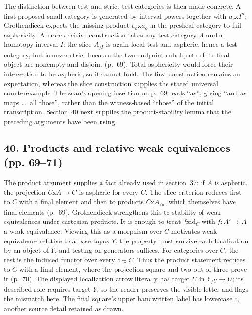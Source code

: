 The distinction between test and strict test categories is then made concrete. A first proposed small category is generated by interval powers together with $a_o\mathrm{x}I^n$; Grothendieck expects the missing product $a_o\mathrm{x}a_o$ in the presheaf category to fail asphericity. A more decisive construction takes any test category $A$ and a homotopy interval $I$: the slice $A_{/I}$ is again local test and aspheric, hence a test category, but is never strict because the two endpoint subobjects of its final object are nonempty and disjoint (p.~69). Total asphericity would force their intersection to be aspheric, so it cannot hold. The first construction remains an expectation, whereas the slice construction supplies the stated universal counterexample. The scan's opening insertion on p.~69 reads ``as'', giving ``and as maps \ldots\ all those'', rather than the witness-based ``those'' of the initial transcription. Section~40 next supplies the product-stability lemma that the preceding arguments have been using.

\subsection*{40. Products and relative weak equivalences (pp. 69--71)}
The product argument supplies a fact already used in section~37: if $A$ is aspheric, the projection $C\mathrm{x}A\to C$ is aspheric for every $C$. The slice criterion reduces first to $C$ with a final element and then to products $C\mathrm{x}A_{/a}$, which themselves have final elements (p.~69). Grothendieck strengthens this to stability of weak equivalences under cartesian products. It is enough to treat $f\mathrm{x}\mathrm{id}_C$ with $f:A'\to A$ a weak equivalence. Viewing this as a morphism over $C$ motivates weak equivalence relative to a base topos $Y$: the property must survive each localization by an object of $Y$, and testing on generators suffices. For categories over $C$, the test is the induced functor over every $c\in C$. Thus the product statement reduces to $C$ with a final element, where the projection square and two-out-of-three prove it (p.~70). The displayed localization arrow literally has target $U$ in $Y_{/U}\to U$; its described role requires target $Y$, so the reader preserves the visible letter and flags the mismatch here. The final square's upper handwritten label has lowercase $c$, another source detail retained as drawn.

